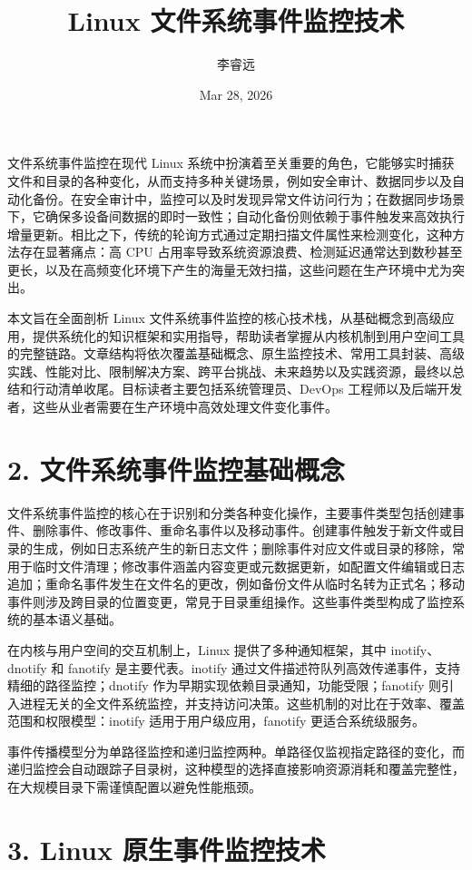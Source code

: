 \title{Linux 文件系统事件监控技术}
\author{李睿远}
\date{Mar 28, 2026}
\maketitle
文件系统事件监控在现代 Linux 系统中扮演着至关重要的角色，它能够实时捕获文件和目录的各种变化，从而支持多种关键场景，例如安全审计、数据同步以及自动化备份。在安全审计中，监控可以及时发现异常文件访问行为；在数据同步场景下，它确保多设备间数据的即时一致性；自动化备份则依赖于事件触发来高效执行增量更新。相比之下，传统的轮询方式通过定期扫描文件属性来检测变化，这种方法存在显著痛点：高 CPU 占用率导致系统资源浪费、检测延迟通常达到数秒甚至更长，以及在高频变化环境下产生的海量无效扫描，这些问题在生产环境中尤为突出。\par
本文旨在全面剖析 Linux 文件系统事件监控的核心技术栈，从基础概念到高级应用，提供系统化的知识框架和实用指导，帮助读者掌握从内核机制到用户空间工具的完整链路。文章结构将依次覆盖基础概念、原生监控技术、常用工具封装、高级实践、性能对比、限制解决方案、跨平台挑战、未来趋势以及实践资源，最终以总结和行动清单收尾。目标读者主要包括系统管理员、DevOps 工程师以及后端开发者，这些从业者需要在生产环境中高效处理文件变化事件。\par
\chapter{2. 文件系统事件监控基础概念}
文件系统事件监控的核心在于识别和分类各种变化操作，主要事件类型包括创建事件、删除事件、修改事件、重命名事件以及移动事件。创建事件触发于新文件或目录的生成，例如日志系统产生的新日志文件；删除事件对应文件或目录的移除，常用于临时文件清理；修改事件涵盖内容变更或元数据更新，如配置文件编辑或日志追加；重命名事件发生在文件名的更改，例如备份文件从临时名转为正式名；移动事件则涉及跨目录的位置变更，常見于目录重组操作。这些事件类型构成了监控系统的基本语义基础。\par
在内核与用户空间的交互机制上，Linux 提供了多种通知框架，其中 inotify、dnotify 和 fanotify 是主要代表。inotify 通过文件描述符队列高效传递事件，支持精细的路径监控；dnotify 作为早期实现依赖目录通知，功能受限；fanotify 则引入进程无关的全文件系统监控，并支持访问决策。这些机制的对比在于效率、覆盖范围和权限模型：inotify 适用于用户级应用，fanotify 更适合系统级服务。\par
事件传播模型分为单路径监控和递归监控两种。单路径仅监视指定路径的变化，而递归监控会自动跟踪子目录树，这种模型的选择直接影响资源消耗和覆盖完整性，在大规模目录下需谨慎配置以避免性能瓶颈。\par
\chapter{3. Linux 原生事件监控技术}
